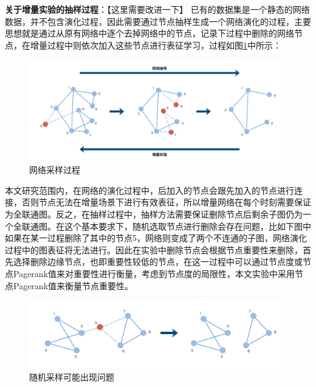 \remark \textbf{关于增量实验的抽样过程}：【这里需要改进一下】 已有的数据集是一个静态的网络数据，并不包含演化过程，因此需要通过节点抽样生成一个网络演化的过程，主要思想就是通过从原有网络中逐个去掉网络中的节点，记录下过程中删除的网络节点，在增量过程中则依次加入这些节点进行表征学习，过程如图\ref{fig:network_sample}中所示：
\begin{figure}
	\centering
	\includegraphics[width=6.2in]{figures/inc_sample}
	\caption{网络采样过程}
	\label{fig:network_sample}
\end{figure}


本文研究范围内，在网络的演化过程中，后加入的节点会跟先加入的节点进行连接，否则节点无法在增量场景下进行有效表征，所以增量网络在每个时刻需要保证为全联通图。反之，在抽样过程中，抽样方法需要保证删除节点后剩余子图仍为一个全联通图。在这个基本要求下，随机选取节点进行删除会存在问题，比如下图中如果在某一过程删除了其中的节点5，网络则变成了两个不连通的子图，网络演化过程中的图表征将无法进行。因此在实验中删除节点会根据节点重要性来删除，首先选择删除边缘节点，也即重要性较低的节点，在这一过程中可以通过节点度或节点Pagerank值\cite{page1999pagerank}来对重要性进行衡量，考虑到节点度的局限性，本文实验中采用节点Pagerank值来衡量节点重要性。
\begin{figure}
	\centering
	\includegraphics[width=6.2in]{figures/sample_split}
	\caption{随机采样可能出现问题}
\end{figure}






